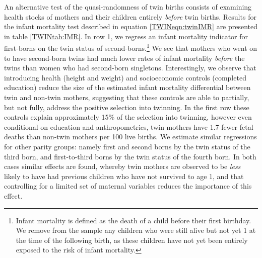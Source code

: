 \documentclass[subeqn]{article}
\begin{document}
\begin{spacing}{1.4}
An alternative test of the quasi-randomness of twin births consists of examining
health stocks of mothers and their children entirely \emph{before} twin births.
Results for the infant mortality test described in equation \ref{TWINeqn:twinIMR}
are presented in table \ref{TWINtab:IMR}. In row 1, we regress an infant mortality
indicator for first-borns on the twin status of second-borns.\footnote{Infant
  mortality is defined as the death of a child before their first birthday. We
  remove from the sample any children who were still alive but not yet 1 at the
  time of the following birth, as these children have not yet been entirely
  exposed to the risk of infant mortality.}  We see that mothers who went on to
have second-born twins had much lower rates of infant mortality \emph{before} the
twins than women who had second-born singletons.  Interestingly, we observe that
introducing health (height and weight) and socioeconomic controls (completed
education) reduce the size of the estimated infant mortality differential between
twin and non-twin mothers, suggesting that these controls are able to partially,
but not fully, address the positive selection into twinning.  In the first row
these controls explain approximately 15\% of the selection into twinning, however
even conditional on education and anthropometrics, twin mothers have 1.7 fewer fetal
deaths than non-twin mothers per 100 live births.  We estimate similar regressions
for other parity groups: namely first and second borns by the twin status of the
third born, and first-to-third borns by the twin status of the fourth born.  In
both cases similar effects are found, whereby twin mothers are observed to be
\emph{less} likely to have had previous children who have not survived to age 1,
and that controlling for a limited set of maternal variables reduces the importance
of this effect.



\end{spacing}
\end{document}
